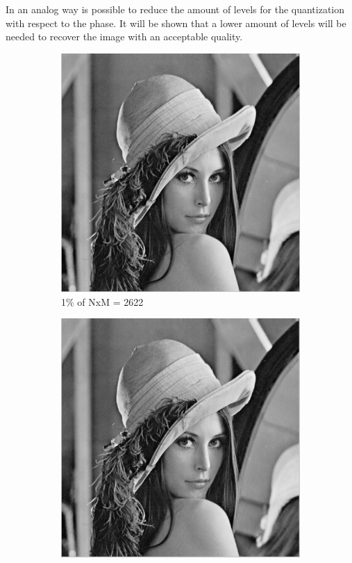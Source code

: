 \documentclass[a4paper, 10pt, conference] {article}
\begin{document}
  In an analog way is possible to reduce the amount of levels for the quantization with respect to the phase. It will be shown that a lower amount of levels will be needed to recover the image with an acceptable quality.
  \begin{figure}[H]
  	\centering
  	\begin{subfigure}{0.24\textwidth} 
  		\centering						
  		\includegraphics[scale=0.3]{reportImages/exp3_phase001.PNG}
  		\caption{1\% of NxM = 2622}
  	\end{subfigure}
  	\begin{subfigure}{0.24\textwidth}
  		\centering
  		\includegraphics[scale=0.3]{reportImages/exp3_phase0001.PNG}

\end{subfigure}
\end{figure}
\end{document}

